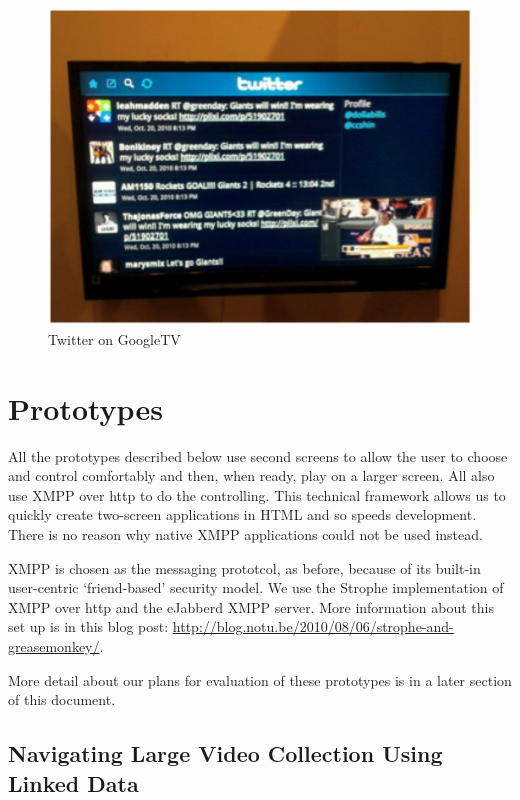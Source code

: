 \documentclass{notube}
\begin{document}
\begin{figure}[htbp]
\begin{center}
\includegraphics[width=6in]{images/googletv.png}
\caption{Twitter on GoogleTV} \label{fig:google}
\end{center}
\end{figure} 



\chapter{Prototypes}

All the prototypes described below use second screens to allow the user to choose and control comfortably and then, when ready, play on a larger screen. All also use XMPP over http to do the controlling. This technical framework allows us to quickly create two-screen applications in HTML and so speeds development. There is no reason why native XMPP applications could not be used instead.

XMPP is chosen as the messaging prototcol, as before, because of its built-in user-centric `friend-based' security model. We use the Strophe implementation of  XMPP over http and the eJabberd XMPP server. More information about this set up is in this blog post:  \url{http://blog.notu.be/2010/08/06/strophe-and-greasemonkey/}.

More detail about our plans for evaluation of these prototypes is in a later section of this document.

\section{Navigating Large Video Collection Using Linked Data}
\end{document}
